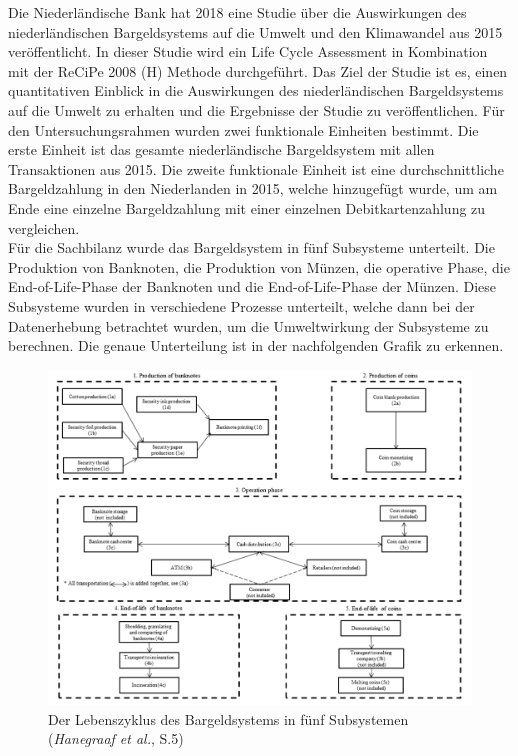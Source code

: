 Die Niederländische Bank hat 2018 eine Studie über die Auswirkungen des niederländischen Bargeldsystems auf die Umwelt und den Klimawandel aus 2015 veröffentlicht. In dieser Studie wird ein Life Cycle Assessment in Kombination mit der ReCiPe 2008 (H) Methode durchgeführt. Das Ziel der Studie ist es, einen quantitativen Einblick in die Auswirkungen des niederländischen Bargeldsystems auf die Umwelt zu erhalten und die Ergebnisse der Studie zu veröffentlichen. Für den Untersuchungsrahmen wurden zwei funktionale Einheiten bestimmt. Die erste Einheit ist das gesamte niederländische Bargeldsystem mit allen Transaktionen aus 2015. Die zweite funktionale Einheit ist eine durchschnittliche Bargeldzahlung in den Niederlanden in 2015, welche hinzugefügt wurde, um am Ende eine einzelne Bargeldzahlung mit einer einzelnen Debitkartenzahlung zu vergleichen.\\
Für die Sachbilanz wurde das Bargeldsystem in fünf Subsysteme unterteilt. Die Produktion von Banknoten, die Produktion von Münzen, die operative Phase, die End-of-Life-Phase der Banknoten und die End-of-Life-Phase der Münzen. Diese Subsysteme wurden in verschiedene Prozesse unterteilt, welche dann bei der Datenerhebung betrachtet wurden, um die Umweltwirkung der Subsysteme zu berechnen. Die genaue Unterteilung ist in der nachfolgenden Grafik zu erkennen.
\FloatBarrier
\begin{figure}[ht!]
    \centering
    \includegraphics[width=\textwidth]{quellen/bgsys.png}
    \caption[Der Lebenszyklus des Bargeldsystems in fünf Subsystemen]{Der Lebenszyklus des Bargeldsystems in fünf Subsystemen (\textit{Hanegraaf et al.}, S.5)}
\end{figure}

